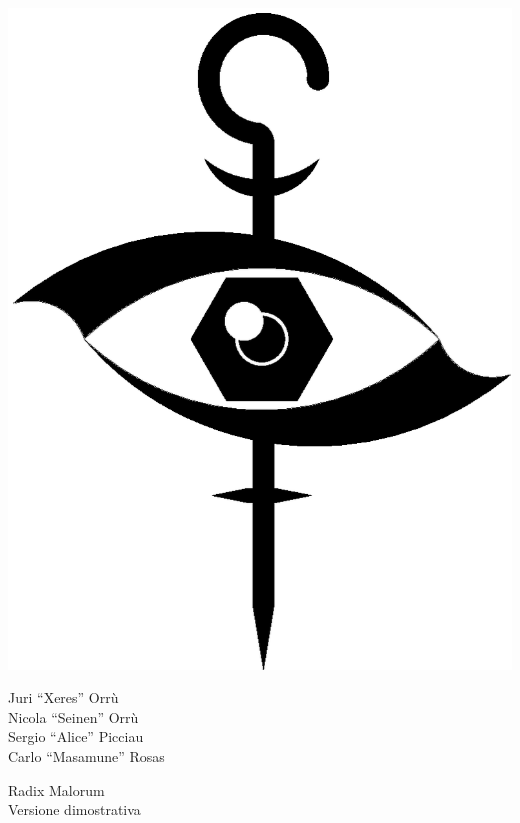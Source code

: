 \documentclass[10pt,italian,twocolumn,twoside,xdvi,openany,a4paper]{book}
\newif\iffullversion
\begin{document}
\thispagestyle{empty}
\begin{titlepage}

\end{titlepage}

\begin{titlepage}
  \begin{center}

    \includegraphics{radixlogo5.eps}

    \vskip 4cm
    \begin{minipage}[c]{16cm}
      \centering
      Juri ``Xeres'' Orr\`u\\Nicola ``Seinen'' Orr\`u\\Sergio ``Alice'' Picciau\\Carlo ``Masamune'' Rosas
    \end{minipage}
    \vskip 1cm

    \begin{minipage}[c]{16cm}
      \centering
\iffullversion
      \Huge\sc Radix Malorum
\else
      \Huge\sc Radix Malorum\\\Large\sc Versione dimostrativa
\fi
    \end{minipage}
  


\end{center}
\end{titlepage}
\end{document}
